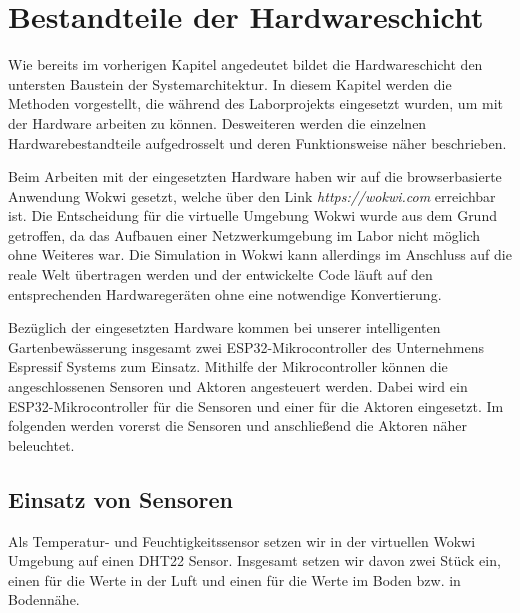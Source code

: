 
\section{Bestandteile der Hardwareschicht}

Wie bereits im vorherigen Kapitel angedeutet bildet die Hardwareschicht den untersten Baustein der Systemarchitektur. In diesem Kapitel werden die Methoden vorgestellt, die während des Laborprojekts eingesetzt wurden, um mit der Hardware arbeiten zu können. Desweiteren werden die einzelnen Hardwarebestandteile aufgedrosselt und deren Funktionsweise näher beschrieben.

Beim Arbeiten mit der eingesetzten Hardware haben wir auf die browserbasierte Anwendung Wokwi gesetzt, welche über den Link \textit{https://wokwi.com} erreichbar ist. Die Entscheidung für die virtuelle Umgebung Wokwi wurde aus dem Grund getroffen, da das Aufbauen einer Netzwerkumgebung im Labor nicht möglich ohne Weiteres war. Die Simulation in Wokwi kann allerdings im Anschluss auf die reale Welt übertragen werden und der entwickelte Code läuft auf den entsprechenden Hardwaregeräten ohne eine notwendige Konvertierung.

Bezüglich der eingesetzten Hardware kommen bei unserer intelligenten Gartenbewässerung insgesamt zwei ESP32-Mikrocontroller des Unternehmens Espressif Systems zum Einsatz. Mithilfe der Mikrocontroller können die angeschlossenen Sensoren und Aktoren angesteuert werden. Dabei wird ein ESP32-Mikrocontroller für die Sensoren und einer für die Aktoren eingesetzt. Im folgenden werden vorerst die Sensoren und anschließend die Aktoren näher beleuchtet.

\subsection{Einsatz von Sensoren}
Als Temperatur- und Feuchtigkeitssensor setzen wir in der virtuellen Wokwi Umgebung auf einen DHT22 Sensor. Insgesamt setzen wir davon zwei Stück ein, einen für die Werte in der Luft und einen für die Werte im Boden bzw. in Bodennähe.

